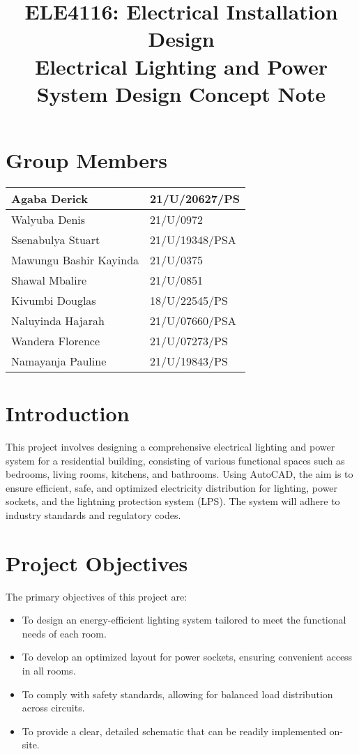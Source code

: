 \documentclass[a4paper,12pt]{article}
\title{\Large ELE4116: Electrical Installation Design\\[0.5cm]
\textbf{\Huge Electrical Lighting and Power System Design Concept Note}}
\author{}
\date{}
\begin{document}
\maketitle

\section*{Group Members}
\begin{table}[H]
    \centering
    \begin{tabular}{|l|l|} 
        \hline
        Agaba Derick & 21/U/20627/PS \\
        \hline
        Walyuba Denis & 21/U/0972 \\
        \hline
        Ssenabulya Stuart & 21/U/19348/PSA \\
        \hline
        Mawungu Bashir Kayinda & 21/U/0375 \\
        \hline
        Shawal Mbalire & 21/U/0851 \\
        \hline
        Kivumbi Douglas & 18/U/22545/PS \\
        \hline
        Naluyinda Hajarah & 21/U/07660/PSA \\
        \hline
        Wandera Florence & 21/U/07273/PS \\
        \hline
        Namayanja Pauline & 21/U/19843/PS \\
        \hline
    \end{tabular}
    \label{<label>}
\end{table}

\section{Introduction}
This project involves designing a comprehensive electrical lighting and power system for a residential building, consisting of various functional spaces such as bedrooms, living rooms, kitchens, and bathrooms. Using AutoCAD, the aim is to ensure efficient, safe, and optimized electricity distribution for lighting, power sockets, and the lightning protection system (LPS). The system will adhere to industry standards and regulatory codes.

\section{Project Objectives}
The primary objectives of this project are:
\begin{itemize}
    \item To design an energy-efficient lighting system tailored to meet the functional needs of each room.
    \item To develop an optimized layout for power sockets, ensuring convenient access in all rooms.
    \item To comply with safety standards, allowing for balanced load distribution across circuits.
    \item To provide a clear, detailed schematic that can be readily implemented on-site.
\end{itemize}
\end{document}
